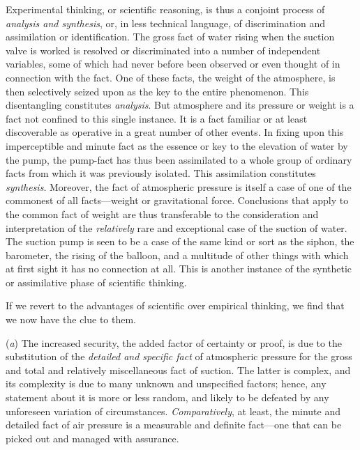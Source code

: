 \documentclass[showtrims,ustradepaper]{memoir}
\begin{document}
Experimental thinking, or scientific reasoning, is thus a conjoint
process of \emph{analysis and synthesis}, or, in less technical
language, of discrimination and assimilation or identification. The
gross fact of water rising when the suction valve is worked is resolved
or discriminated into a number of independent variables, some of which
had never before been observed or even thought of in connection with the
fact. One of these facts, the weight of the atmosphere, is then
selectively seized upon as the key to the entire phenomenon. This
disentangling constitutes \emph{analysis}. But atmosphere and its
pressure or weight is a fact not confined to this single instance. It is
a fact familiar or at least discoverable as operative in a great number
of other events. In fixing upon this imperceptible and minute fact as
the essence or key to the elevation of water by the pump, the pump-fact
has thus been assimilated to a whole group of ordinary facts from which
it was previously isolated. This assimilation constitutes
\emph{synthesis}. Moreover, the fact of atmospheric pressure is itself a
case of one of the commonest of all facts---weight or gravitational
force. Conclusions that apply to the common fact of weight are thus
transferable to the consideration and interpretation of the
\emph{relatively} rare and exceptional case of the suction of water. The
suction pump is seen to be a case of the same kind or sort as the
siphon,
the
barometer, the rising of the balloon, and a multitude of other things
with which at first sight it has no connection at all. This is another
instance of the synthetic or assimilative phase of scientific thinking.

If we revert to the advantages of scientific over empirical thinking, we
find that we now have the clue to them.


(\emph{a}) The increased security, the added factor of certainty or
proof, is due to the substitution of the \emph{detailed and specific
fact} of atmospheric pressure for the gross and total and relatively
miscellaneous fact of suction. The latter is complex, and its complexity
is due to many unknown and unspecified factors; hence, any statement
about it is more or less random, and likely to be defeated by any
unforeseen variation of circumstances. \emph{Comparatively}, at least,
the minute and detailed fact of air pressure is a measurable and
definite fact---one that can be picked out and managed with assurance.
\end{document}
